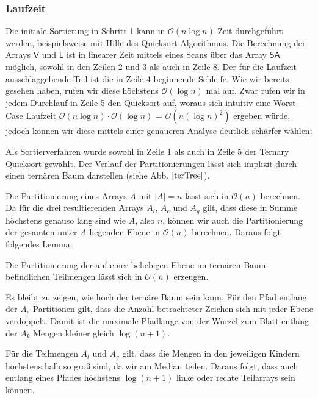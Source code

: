 \subsubsection{Laufzeit}
Die initiale Sortierung in Schritt 1 kann in $\mathcal{O}(n\log n)$ Zeit durchgeführt werden, beispielsweise mit Hilfe des Quicksort-Algorithmus. Die Berechnung der Arrays $\mathsf{V}$ und $\mathsf{L}$ ist in linearer Zeit mittels eines Scans über das Array $\mathsf{SA}$ möglich, sowohl in den Zeilen 2 und 3 als auch in Zeile 8. Der für die Laufzeit ausschlaggebende Teil ist die in Zeile 4 beginnende Schleife. Wie wir bereits gesehen haben, rufen wir diese höchstens $\mathcal{O}(\log n)$ mal auf. Zwar rufen wir in jedem Durchlauf in Zeile 5 den Quicksort auf, woraus sich intuitiv eine Worst-Case Laufzeit $\mathcal{O}(n\log  n)\cdot \mathcal{O}(\log n)$ = $\mathcal{O}(n(\log n)^2)$ ergeben würde, jedoch können wir diese mittels einer genaueren Analyse deutlich schärfer wählen:

Als Sortierverfahren wurde sowohl in Zeile 1 als auch in Zeile 5 der Ternary Quicksort gewählt. Der Verlauf der Partitionierungen lässt sich implizit durch einen ternären Baum darstellen (siehe Abb. $\ref{terTree}$).

Die Partitionierung eines Arrays $A$ mit $|A|=n$ lässt sich in $\mathcal{O}(n)$ berechnen. Da für die drei resultierenden Arrays $A_l$, $A_e$ und $A_g$ gilt, dass diese in Summe höchstens genauso lang sind wie $A$, also $n$, können wir auch die Partitionierung der gesamten unter $A$ liegenden Ebene in $\mathcal{O}(n)$ berechnen. Daraus folgt folgendes Lemma:
\begin{lemma}
Die Partitionierung der auf einer beliebigen Ebene im ternären Baum befindlichen Teilmengen lässt sich in $\mathcal{O}(n)$ erzeugen. 
\end{lemma}
Es bleibt zu zeigen, wie hoch der ternäre Baum sein kann. Für den Pfad entlang der $A_e$-Partitionen gilt, dass die Anzahl betrachteter Zeichen sich mit jeder Ebene verdoppelt. Damit ist die maximale Pfadlänge von der Wurzel zum Blatt entlang der $A_k$ Mengen kleiner gleich $ \log (n+1)$.

Für die Teilmengen $A_l$ und $A_g$ gilt, dass die Mengen in den jeweiligen Kindern höchstens halb so groß sind, da wir am Median teilen. Daraus folgt, dass auch entlang eines Pfades höchstens $\log (n+1)$ linke oder rechte Teilarrays sein können.

